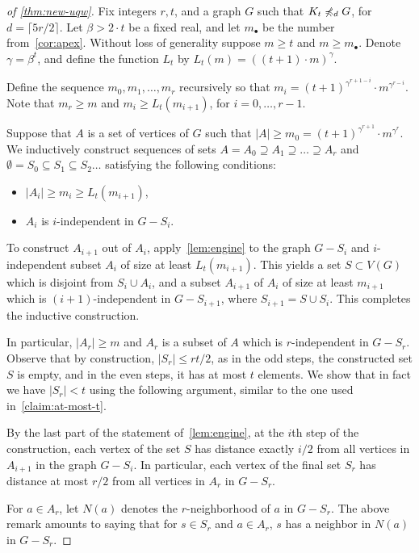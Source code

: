 \begin{proof}[of \cref{thm:new-uqw}]
Fix integers $r,t$,  and a graph $G$ such that $K_t\not\preccurlyeq_{d} G$,
for $d=\lceil 5r/2 \rceil$. Let $\beta>2\cdot t$ be a fixed real, and let $m_\bullet$ be the number from~\cref{cor:apex}. Without loss of generality suppose $m\geq t$ and $m\ge m_\bullet$.
 Denote $\gamma=\beta^t$, and
define the function $L_t$ by $L_t(m)=((t+1)\cdot m)^\gamma$.

Define the sequence $m_0,m_1,\ldots,m_r$ recursively so that $m_i=
(t+1)^{\gamma^{r+1-i}}\cdot m^{\gamma^{r-i}}$. Note that $m_r\ge m$
and $m_i\ge L_t(m_{i+1})$, for $i=0,\ldots,r-1$.

Suppose that $A$ is a set of vertices of $G$ such that $|A|\ge m_0=(t+1)^{\gamma^{r+1}}\cdot m^{\gamma^{r}}$. We inductively construct sequences of sets $A= A_0\supseteq A_1\supseteq \ldots \supseteq A_r$ and $\emptyset=S_0\subseteq S_1\subseteq S_2\ldots$
satisfying the following conditions:
\begin{itemize}
	\item $|A_i|\ge m_i \ge L_t(m_{i+1})$,
	\item $A_i$ is $i$-independent in $G-S_i$.
\end{itemize}
To construct $A_{i+1}$ out of $A_i$, apply~\cref{lem:engine} to the graph $G-S_i$ and 
$i$-independent subset $A_i$ of size at least $L_t(m_{i+1})$. This yields a set $S\subset V(G)$ which is disjoint from $S_i\cup A_i$, and a subset $A_{i+1}$ of $A_i$ of size 
at least $m_{i+1}$
which is $(i+1)$-independent in $G-S_{i+1}$, where $S_{i+1}=S\cup S_i$. This completes the inductive construction.

In particular,  $|A_r|\ge m$ and $A_r$ is a subset of $A$ which is $r$-independent in $G-S_r$.
Observe that by construction, $|S_r|\le r t/2$, as in the odd steps, the constructed set $S$ is empty, and in the even steps, it has at most $t$ elements.  We show that in fact we have $|S_r|<t$ using the following argument, similar to the one used in~\cref{claim:at-most-t}.


By the last part of the statement of~\cref{lem:engine},  at the $i$th step of the construction, each vertex of the set $S$
has distance exactly $i/2$ from all vertices in $A_{i+1}$ in the graph 
$G-S_i$. In particular, 
each vertex of the final set $S_r$ has distance at most $r/2$ from all vertices in $A_r$
in $G-S_r$. 

For $a\in A_r$, let $N(a)$ denotes the $r$-neighborhood of $a$ in $G-S_r$.
The above remark amounts to saying that for $s\in S_r$ and $a\in A_r$, $s$ has a neighbor in $N(a)$ in $G-S_r$.


\end{proof}
